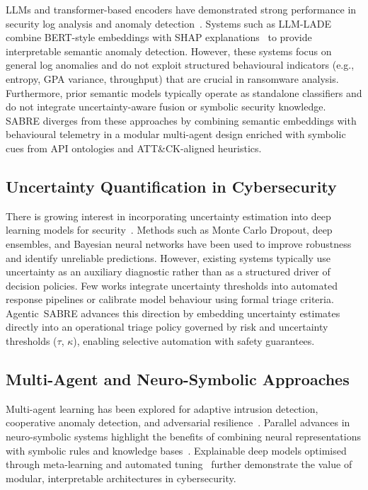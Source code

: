 \documentclass[3p]{elsarticle}
\begin{document}
LLMs and transformer-based encoders have demonstrated strong performance in
security log analysis and anomaly detection~\cite{tian2025llmsurvey, BenchmarkingLLMsPhishing2024}. Systems such as LLM-LADE~\cite{ZhangLZYHY25}
combine BERT-style embeddings with SHAP explanations~\cite{lundberg2017shap} to provide interpretable semantic anomaly detection. However, these systems focus on general log anomalies and do not exploit structured behavioural indicators (e.g., entropy, GPA variance, throughput) that are crucial in ransomware analysis. Furthermore, prior semantic models typically operate as standalone classifiers and do not integrate uncertainty-aware fusion or symbolic security knowledge. SABRE diverges from these approaches by combining semantic embeddings with
behavioural telemetry in a modular multi-agent design enriched with symbolic cues from API ontologies and ATT\&CK-aligned heuristics.

\subsection{Uncertainty Quantification in Cybersecurity}

There is growing interest in incorporating uncertainty estimation into deep
learning models for security~\cite{kabuye2025explainable}. Methods such as Monte Carlo Dropout, deep ensembles, and Bayesian neural networks have been used to improve robustness and identify unreliable predictions. However, existing systems typically use uncertainty as an auxiliary diagnostic rather than as a structured driver of decision policies. Few works integrate uncertainty thresholds into automated response pipelines or calibrate model behaviour using formal triage criteria. Agentic~SABRE advances this direction by embedding uncertainty estimates directly into an operational triage policy governed by risk and uncertainty thresholds (\(\tau\), \(\kappa\)), enabling selective automation with safety guarantees.

\subsection{Multi-Agent and Neuro-Symbolic Approaches}

Multi-agent learning has been explored for adaptive intrusion detection,
cooperative anomaly detection, and adversarial resilience~\cite{AdversarialCooperationLLM2024, MultiAgentAdaptiveDetection2023}. Parallel advances in neuro-symbolic systems highlight the benefits of combining neural representations with symbolic rules and knowledge bases~\cite{YangSBK25}. Explainable deep models optimised through meta-learning and automated tuning~\cite{FaresE25} further demonstrate the value of modular, interpretable architectures in cybersecurity.
\end{document}
